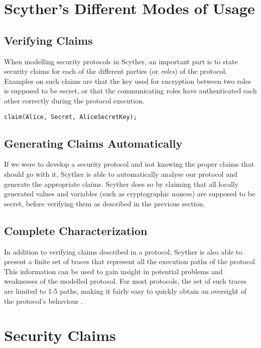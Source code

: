 \section{Scyther's Different Modes of Usage}

\subsection{Verifying Claims}

When modelling security protocols in Scyther, an important part is to state security claims for each of the different parties (or \emph{roles}) of the protocol. Examples on such claims are that the key used for encryption between two roles is supposed to be secret, or that the communicating roles have authenticated each other correctly during the protocol execution. 
\begin{verbatim}
claim(Alice, Secret, AliceSecretKey);
\end{verbatim}

\subsection{Generating Claims Automatically}

If we were to develop a security protocol and not knowing the proper claims that should go with it, Scyther is able to automatically analyse our protocol and generate the appropriate claims. Scyther does so by claiming that all locally generated values and variables (such as cryptographic nonces) are supposed to be secret, before verifying them as described in the previous section.

\subsection{Complete Characterization}


In addition to verifying claims described in a protocol, Scyther is also able to present a finite set of traces that represent all the execution paths of the protocol. This information can be used to gain insight in potential problems and weaknesses of the modelled protocol. For most protocols, the set of such traces are limited to 1-5 paths, making it fairly easy to quickly obtain an oversight of the protocol's behaviour \cite{cremers2008scyther}.




\section{Security Claims}

